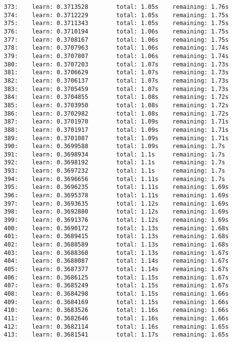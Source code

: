 \documentclass[11pt]{article}
\begin{document}
\begin{Verbatim}[commandchars=\\\{\}]
373:    learn: 0.3713528        total: 1.05s    remaining: 1.76s
374:    learn: 0.3712229        total: 1.05s    remaining: 1.75s
375:    learn: 0.3711343        total: 1.05s    remaining: 1.75s
376:    learn: 0.3710194        total: 1.06s    remaining: 1.75s
377:    learn: 0.3708167        total: 1.06s    remaining: 1.75s
378:    learn: 0.3707963        total: 1.06s    remaining: 1.74s
379:    learn: 0.3707807        total: 1.06s    remaining: 1.74s
380:    learn: 0.3707203        total: 1.07s    remaining: 1.73s
381:    learn: 0.3706629        total: 1.07s    remaining: 1.73s
382:    learn: 0.3706137        total: 1.07s    remaining: 1.73s
383:    learn: 0.3705459        total: 1.07s    remaining: 1.73s
384:    learn: 0.3704855        total: 1.08s    remaining: 1.72s
385:    learn: 0.3703950        total: 1.08s    remaining: 1.72s
386:    learn: 0.3702982        total: 1.08s    remaining: 1.72s
387:    learn: 0.3701970        total: 1.09s    remaining: 1.71s
388:    learn: 0.3701917        total: 1.09s    remaining: 1.71s
389:    learn: 0.3701087        total: 1.09s    remaining: 1.71s
390:    learn: 0.3699588        total: 1.09s    remaining: 1.7s
391:    learn: 0.3698934        total: 1.1s     remaining: 1.7s
392:    learn: 0.3698192        total: 1.1s     remaining: 1.7s
393:    learn: 0.3697232        total: 1.1s     remaining: 1.7s
394:    learn: 0.3696656        total: 1.11s    remaining: 1.7s
395:    learn: 0.3696235        total: 1.11s    remaining: 1.69s
396:    learn: 0.3695378        total: 1.11s    remaining: 1.69s
397:    learn: 0.3693635        total: 1.12s    remaining: 1.69s
398:    learn: 0.3692880        total: 1.12s    remaining: 1.69s
399:    learn: 0.3691376        total: 1.12s    remaining: 1.69s
400:    learn: 0.3690172        total: 1.13s    remaining: 1.68s
401:    learn: 0.3689415        total: 1.13s    remaining: 1.68s
402:    learn: 0.3688589        total: 1.13s    remaining: 1.68s
403:    learn: 0.3688360        total: 1.13s    remaining: 1.67s
404:    learn: 0.3688087        total: 1.14s    remaining: 1.67s
405:    learn: 0.3687377        total: 1.14s    remaining: 1.67s
406:    learn: 0.3686125        total: 1.15s    remaining: 1.67s
407:    learn: 0.3685249        total: 1.15s    remaining: 1.67s
408:    learn: 0.3684298        total: 1.15s    remaining: 1.66s
409:    learn: 0.3684169        total: 1.15s    remaining: 1.66s
410:    learn: 0.3683526        total: 1.16s    remaining: 1.66s
411:    learn: 0.3682646        total: 1.16s    remaining: 1.66s
412:    learn: 0.3682114        total: 1.16s    remaining: 1.65s
413:    learn: 0.3681541        total: 1.17s    remaining: 1.65s

\end{Verbatim}
\end{document}
